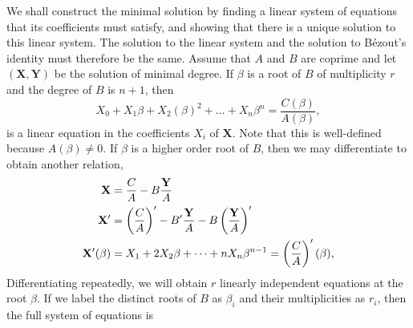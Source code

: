 \documentclass{article}
\begin{document}
We shall construct the minimal solution by finding a linear system of equations that its coefficients must satisfy, and showing that there is a unique solution to this linear system. The solution to the linear system and the solution to B\'ezout's identity must therefore be the same. Assume that $A$ and $B$ are coprime and let $(\mathbf{X},\mathbf{Y})$ be the solution of minimal degree. If $\beta$ is a root of $B$ of multiplicity $r$ and the degree of $B$ is $n+1$, then
\[
X_0 + X_1 \beta + X_2 (\beta)^2 + \dots + X_n \beta^n = \frac{C(\beta)}{A(\beta)},
\]
is a linear equation in the coefficients $X_i$ of $\mathbf{X}$. Note that this is well-defined because $A(\beta)\neq 0$. If $\beta$ is a higher order root of $B$, then we may differentiate to obtain another relation,
\begin{align*}
\mathbf{X} &= \frac{C}{A} - B\frac{\mathbf{Y}}{A} \\
\mathbf{X}' &= \left(\frac{C}{A}\right)' - B'\frac{\mathbf{Y}}{A} - B\left(\frac{\mathbf{Y}}{A}\right)'\\
\mathbf{X}'(\beta) &= X_1 + 2 X_2 \beta + \dots + n X_n \beta^{n-1} = \left(\frac{C}{A}\right)'(\beta),
\end{align*}
Differentiating repeatedly, we will obtain $r$ linearly independent equations at the root $\beta$. If we label the distinct roots of $B$ as $\beta_i$ and their multiplicities as $r_i$, then the full system of equations is
\end{document}
